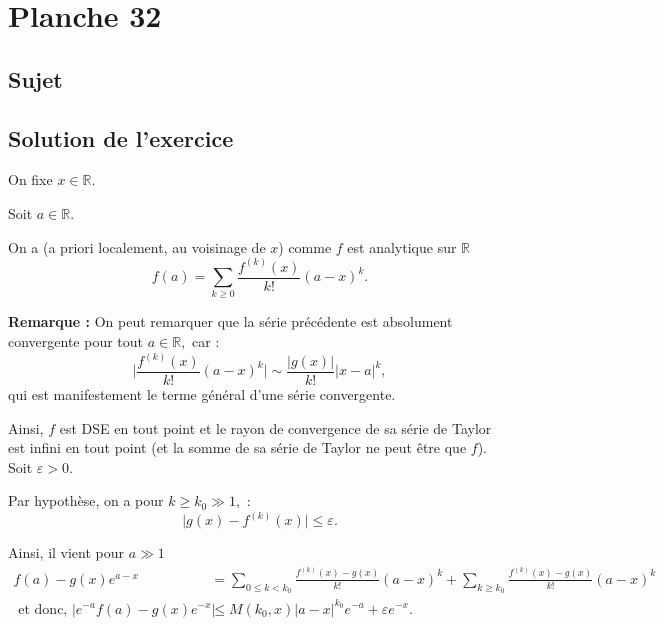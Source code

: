 \chapter{Planche 32}

\section{Sujet}

\section{Solution de l'exercice}

On fixe $x\in \mathbb{R}.$

Soit $a\in \mathbb{R}.$

On a (a priori localement, au voisinage de $x$) comme $f$ est analytique sur $\mathbb{R}$
$$f(a)=\sum_{k\geq 0}\frac{f^{(k)}(x)}{k!}(a-x)^{k}.$$

\textbf{Remarque :} On peut remarquer que la série précédente est absolument convergente pour tout $a\in \mathbb{R},$ car : $$\vert \frac{f^{(k)}(x)}{k!}(a-x)^{k}\vert \sim \frac{\vert g(x) \vert }{k!}\vert x-a\vert^{k},$$ qui est manifestement le terme général d'une série convergente. 

Ainsi, $f$ est DSE en tout point et le rayon de convergence de sa série de Taylor est infini en tout point (et la somme de sa série de Taylor ne peut être que $f$).\\


Soit $\varepsilon>0.$

Par hypothèse, on a pour $k\geq k_{0}\gg 1,$ : $$\vert g(x)-f^{(k)}(x)\vert \leq \varepsilon.$$

Ainsi, il vient pour $a\gg 1$
\begin{align*}
f(a)-g(x)e^{a-x} & =\sum_{0\leq k< k_{0}}\frac{f^{(k)}(x)-g(x)}{k!}(a-x)^{k}+\sum_{k\geq k_{0}}\frac{f^{(k)}(x)-g(x)}{k!}(a-x)^{k}\\
\mbox{ et donc, } \vert e^{-a}f(a)-g(x)e^{-x}\vert & \leq M(k_{0},x)\vert a-x\vert^{k_{0}}e^{-a}+\varepsilon e^{-x}.
\end{align*}

